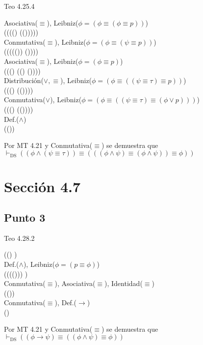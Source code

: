 \documentclass{article}
\begin{document}
\begin{logicenv}{Teo 4.25.4}
\begin{derivation}
        Asociativa($\equiv$), Leibniz($\phi = (\phi \equiv (\phi \equiv p))$)\\
            (\phi \equiv (\psi \equiv ((\phi \lor \psi) \equiv (\tau  \equiv (\phi \lor \psi)))))\\
        Conmutativa($\equiv$), Leibniz($\phi = (\phi \equiv (\psi \equiv p))$)\\
            (\phi \equiv (\psi \equiv ((\tau  \equiv (\phi \lor \psi)) \equiv (\phi \lor \psi))))\\
        Asociativa($\equiv$), Leibniz($\phi = (\phi \equiv p)$)\\
            (\phi \equiv ((\phi \equiv \tau) \equiv ((\phi \lor \tau) \equiv (\phi \lor \psi))))\\
        Distribución($\lor, \equiv$), Leibniz($\phi = (\phi \equiv ((\psi \equiv \tau)\equiv p))$)\\
            (\phi \equiv ((\psi \equiv \tau) \equiv (\phi \lor (\tau \equiv \psi))))\\
        Conmutativa($\lor$), Leibniz($\phi = (\phi \equiv ((\psi \equiv \tau) \equiv (\phi \lor p)))$)\\
            (\phi \equiv ((\psi \equiv \tau) \equiv (\phi \lor (\psi \equiv \tau))))\\
        Def.($\land$)\\
            (\phi \land (\psi \equiv \tau))
    \end{derivation}
    Por MT 4.21 y Conmutativa($\equiv$) se demuestra que\\
    $\vdash_{\text{DS}} ((\phi \land (\psi \equiv \tau)) \equiv (((\phi \land \psi) \equiv (\phi \land \psi)) \equiv \phi))$
\end{logicenv}


\section{Sección 4.7}
\subsection{Punto 3}
\begin{logicenv}{Teo 4.28.2}
    \begin{derivation}
            ((\phi \land \psi) \equiv \phi)\\
        Def.($\land$), Leibniz($\phi = (p \equiv \phi)$)\\
            ((\phi \equiv (\psi \equiv (\phi \lor \psi))) \equiv \phi)\\
        Conmutativa($\equiv$), Asociativa($\equiv$), Identidad($\equiv$)\\
            (\psi \equiv (\phi \lor \psi))\\
        Conmutativa($\equiv$), Def.($\to$)\\
            (\phi \to \psi)
    \end{derivation}
    Por MT 4.21 y Conmutativa($\equiv$) se demuestra que\\
    $\vdash_{\text{DS}} ((\phi \to \psi) \equiv ((\phi \land \psi) \equiv \phi))$
\end{logicenv}
\end{document}
